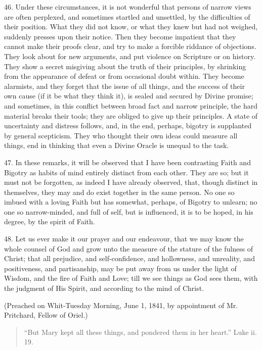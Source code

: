 46. Under these circumstances, it is not wonderful that persons of
narrow views are often perplexed, and sometimes startled and
unsettled, by the difficulties of their position. What they did not
know, or what they knew but had not weighed, suddenly presses upon
their notice. Then they become impatient that they cannot make their
proofs clear, and try to make a forcible riddance of objections. They
look about for new arguments, and put violence on Scripture or on
history. They show a secret misgiving about the truth of their
principles, by shrinking from the appearance of defeat or from
occasional doubt within. They become alarmists, and they forget that
the issue of all things, and the success of their own cause (if it be
what they think it), is sealed and secured by Divine promise; and
sometimes, in this conflict between broad fact and narrow principle,
the hard material breaks their tools; they are obliged to give up
their principles. A state of uncertainty and distress follows, and, in
the end, perhaps, bigotry is supplanted by general scepticism. They
who thought their own ideas could measure all things, end in thinking
that even a Divine Oracle is unequal to the task.

47. In these remarks, it will be observed that I have been
contrasting Faith and Bigotry as habits of mind entirely distinct from
each other. They are so; but it must not be forgotten, as indeed I
have already observed, that, though distinct in themselves, they may
and do exist together in the same person. No one so imbued with a
loving Faith but has somewhat, perhaps, of Bigotry to unlearn; no one
so narrow-minded, and full of self, but is influenced, it is to be
hoped, in his degree, by the spirit of Faith.

48. Let us ever make it our prayer and our endeavour, that we may
know the whole counsel of God and grow unto the measure of the stature
of the fulness of Christ; that all prejudice, and self-confidence, and
hollowness, and unreality, and positiveness, and partisanship, may be
put away from us under the light of Wisdom, and the fire of Faith and
Love; till we see things as God sees them, with the judgment of His
Spirit, and according to the mind of Christ.

(Preached on Whit-Tuesday Morning, June 1, 1841, by appointment of
Mr. Pritchard, Fellow of Oriel.)


\begin{quote}

``But Mary kept all these things, and pondered them in her
heart.'' Luke ii. 19.

\end{quote}

